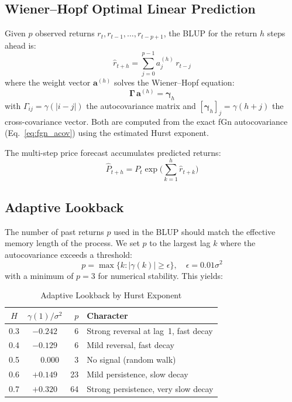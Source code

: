 \documentclass[12pt,a4paper]{article}
\begin{document}
\subsection{Wiener--Hopf Optimal Linear Prediction}
\label{sec:wiener_hopf}

Given $p$ observed returns $r_t, r_{t-1}, \ldots, r_{t-p+1}$, the BLUP
for the return $h$ steps ahead is:
\begin{equation}
  \hat{r}_{t+h} = \sum_{j=0}^{p-1} a_j^{(h)}\, r_{t-j}
  \label{eq:blup}
\end{equation}
where the weight vector $\mathbf{a}^{(h)}$ solves the Wiener--Hopf
equation:
\begin{equation}
  \boldsymbol{\Gamma}\,\mathbf{a}^{(h)} = \boldsymbol{\gamma}_h
  \label{eq:wiener_hopf}
\end{equation}
with $\Gamma_{ij} = \gamma(|i-j|)$ the autocovariance matrix and
$[\boldsymbol{\gamma}_h]_j = \gamma(h+j)$ the cross-covariance vector.
Both are computed from the exact fGn autocovariance
(Eq.~\ref{eq:fgn_acov}) using the estimated Hurst exponent.

The multi-step price forecast accumulates predicted returns:
\begin{equation}
  \hat{P}_{t+h} = P_t \exp\!\Biggl(\sum_{k=1}^{h} \hat{r}_{t+k}\Biggr)
  \label{eq:price_forecast}
\end{equation}

\subsection{Adaptive Lookback}
\label{sec:adaptive_lookback}

The number of past returns $p$ used in the BLUP should match the effective
memory length of the process.  We set $p$ to the largest lag $k$ where the
autocovariance exceeds a threshold:
\begin{equation}
  p = \max\bigl\{k : |\gamma(k)| \geq \epsilon\bigr\},
  \quad \epsilon = 0.01\sigma^2
  \label{eq:adaptive_lookback}
\end{equation}
with a minimum of $p = 3$ for numerical stability.  This yields:

\begin{table}[htbp]
  \centering
  \caption{Adaptive Lookback by Hurst Exponent}
  \label{tab:lookback}
  \begin{tabular}{ccrl}
    \toprule
    $H$ & $\gamma(1)/\sigma^2$ & $p$ & Character \\
    \midrule
    0.3 & $-0.242$ & 6  & Strong reversal at lag~1, fast decay \\
    0.4 & $-0.129$ & 6  & Mild reversal, fast decay \\
    0.5 & $\phantom{-}0.000$ & 3  & No signal (random walk) \\
    0.6 & $+0.149$ & 23 & Mild persistence, slow decay \\
    0.7 & $+0.320$ & 64 & Strong persistence, very slow decay \\
    \bottomrule
  \end{tabular}
\end{table}
\end{document}
